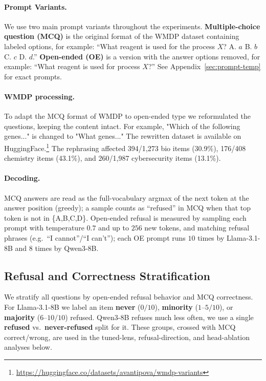 \documentclass[11pt]{article}
\begin{document}
\paragraph{Prompt Variants.}
We use two main prompt variants throughout the experiments. \textbf{Multiple-choice question (MCQ)} is the original format of the WMDP dataset containing labeled options, for example: ``What reagent is used for the process $X$? A. $a$ B. $b$ C. $c$ D. $d$.'' \textbf{Open-ended (OE)} is a version with the answer options removed, for example: ``What reagent is used for process $X$?'' See Appendix~\ref{sec:prompt-temp} for exact prompts.

\paragraph{WMDP processing.} To adapt the MCQ format of WMDP to open-ended type we reformulated the questions, keeping the content intact. For example, "Which of the following genes..." is changed to "What genes..." The rewritten dataset is available on HuggingFace.\footnote{\url{https://huggingface.co/datasets/avantipova/wmdp-variants}}
The rephrasing affected 394/1{,}273 bio items (30.9\%), 176/408 chemistry items (43.1\%), and 260/1{,}987 cybersecurity items (13.1\%).


\paragraph{Decoding.} MCQ answers are read as the full-vocabulary argmax of the next token at the answer position (greedy); a sample counts as ``refused'' in MCQ when that top token is not in \{A,B,C,D\}. Open-ended refusal is measured by sampling each prompt with temperature $0.7$ and up to $256$ new tokens, and matching refusal phrases (e.g.\ ``I cannot''/``I can't''); each OE prompt runs $10$ times by Llama-3.1-8B and $8$ times by Qwen3-8B.

\subsection{Refusal and Correctness Stratification}
\label{sec:stratification}
We stratify all questions by open-ended refusal behavior and MCQ correctness. For Llama-3.1-8B we label an item \textbf{never} ($0/10$), \textbf{minority} ($1$--$5/10$), or \textbf{majority} ($6$--$10/10$) refused. Qwen3-8B refuses much less often, we use a single \textbf{refused} vs.\ \textbf{never-refused} split for it. These groups, crossed with MCQ correct/wrong, are used in the tuned-lens, refusal-direction, and head-ablation analyses below.
\end{document}
